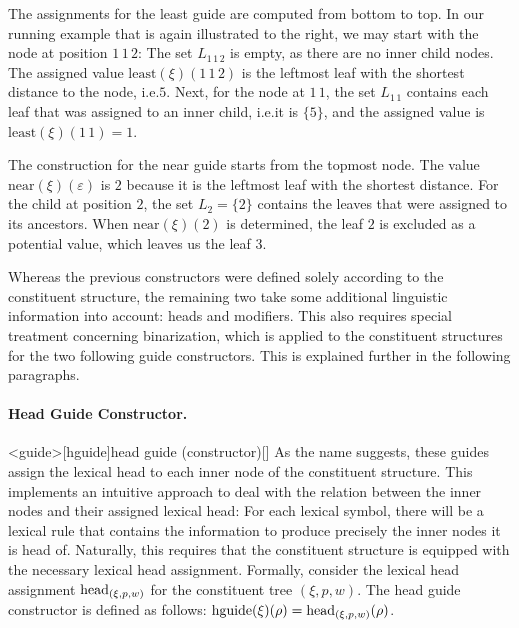 \documentclass[../../document.tex]{subfiles}
\begin{document}
    \needspace{3cm}
    \begin{wrapfigure}[6]{r}{.3\linewidth}
        \centering
        
    \end{wrapfigure}
    The assignments for the least guide are computed from bottom to top.
    In our running example that is again illustrated to the right, we may start with the node at position \(1\,1\,2\): The set \(L_{1\,1\,2}\) is empty, as there are no inner child nodes. The assigned value \(\mathrm{least}(\xi)(1\,1\,2)\) is the leftmost leaf with the shortest distance to the node, i.e.\@ \(5\).
    Next, for the node at \(1\,1\), the set \(L_{1\,1}\) contains each leaf that was assigned to an inner child, i.e.\@ it is \(\{5\}\), and the assigned value is \(\mathrm{least}(\xi)(1\,1) = 1\).
    \exampleqed

    \begin{example}
        The construction for the near guide starts from the topmost node.
        The value \(\mathrm{near}(\xi)(\varepsilon)\) is \(2\) because it is the leftmost leaf with the shortest distance.
        For the child at position \(2\), the set \(L_{2} = \{2\}\) contains the leaves that were assigned to its ancestors.
        When \(\mathrm{near}(\xi)(2)\) is determined, the leaf \(2\) is excluded as a potential value, which leaves us the leaf \(3\).
    \end{example}

    Whereas the previous constructors were defined solely according to the constituent structure, the remaining two take some additional linguistic information into account: heads and modifiers.
    This also requires special treatment concerning binarization, which is applied to the constituent structures for the two following guide constructors.
    This is explained further in the following paragraphs.

    \paragraph{Head Guide Constructor.}<guide>[hguide]{head guide (constructor)}[]
    As the name suggests, these guides assign the lexical head to each inner node of the constituent structure.
    This implements an intuitive approach to deal with the relation between the inner nodes and their assigned lexical head: For each lexical symbol, there will be a lexical rule that contains the information to produce precisely the inner nodes it is head of.
    Naturally, this requires that the constituent structure is equipped with the necessary lexical head assignment.
    Formally, consider the lexical head assignment \(\operatorname{head}_{(\xi,p,w)}\) for the constituent tree \((\xi, p, w)\).
    The head guide constructor is defined as follows: \(\mathrm{hguide}(\xi)(\rho) = \operatorname{head}_{(\xi,p,w)}(\rho)\).
\end{document}

